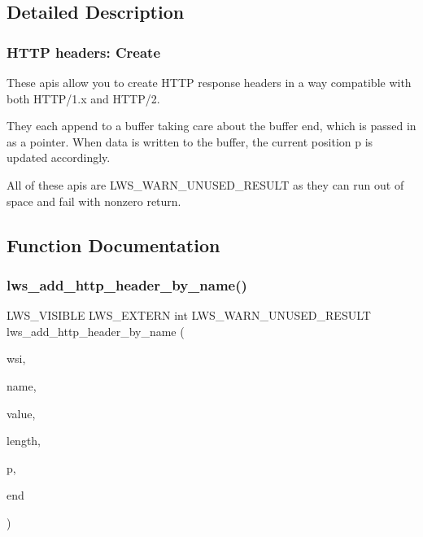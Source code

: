 \subsection{Detailed Description}
\subsubsection*{H\+T\+TP headers\+: Create}

These apis allow you to create H\+T\+TP response headers in a way compatible with both H\+T\+T\+P/1.\+x and H\+T\+T\+P/2.

They each append to a buffer taking care about the buffer end, which is passed in as a pointer. When data is written to the buffer, the current position p is updated accordingly.

All of these apis are L\+W\+S\+\_\+\+W\+A\+R\+N\+\_\+\+U\+N\+U\+S\+E\+D\+\_\+\+R\+E\+S\+U\+LT as they can run out of space and fail with nonzero return. 

\subsection{Function Documentation}
\mbox{\label{group__HTTP-headers-create_ga2b36bf44405755ff51c1939303b995a8}} 
\subsubsection{\texorpdfstring{lws\+\_\+add\+\_\+http\+\_\+header\+\_\+by\+\_\+name()}{lws\_add\_http\_header\_by\_name()}}
{\footnotesize\ttfamily L\+W\+S\+\_\+\+V\+I\+S\+I\+B\+LE L\+W\+S\+\_\+\+E\+X\+T\+E\+RN int L\+W\+S\+\_\+\+W\+A\+R\+N\+\_\+\+U\+N\+U\+S\+E\+D\+\_\+\+R\+E\+S\+U\+LT lws\+\_\+add\+\_\+http\+\_\+header\+\_\+by\+\_\+name (\begin{DoxyParamCaption}\item[{struct \hyperlink{structlws}{lws} $\ast$}]{wsi,  }\item[{const unsigned char $\ast$}]{name,  }\item[{const unsigned char $\ast$}]{value,  }\item[{int}]{length,  }\item[{unsigned char $\ast$$\ast$}]{p,  }\item[{unsigned char $\ast$}]{end }\end{DoxyParamCaption})}

